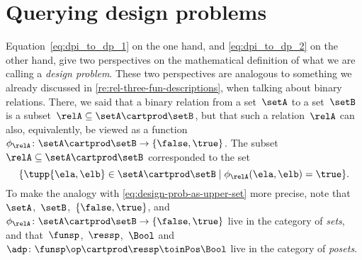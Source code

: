 
\section{Querying design problems}
\label{sec:dp-querying}



Equation~\cref{eq:dpi_to_dp_1} on the one hand, and \cref{eq:dpi_to_dp_2} on the other hand, give two perspectives on the mathematical definition of what we are calling a \emph{design problem}.
These two perspectives are analogous to something we already discussed in \cref{re:rel-three-fun-descriptions}, when talking about binary relations.
There, we said that a binary relation from a set~$\setA$ to a set~$\setB$ is a subset~$\relA \subseteq \setA \cartprod \setB$,
but that such a relation~$\relA$ can also, equivalently, be viewed as a function~$\phi_{\relA}\colon \setA \cartprod\setB \to \{ \false, \true \}$.
The subset~$\relA \subseteq \setA \cartprod \setB$ corresponded to the set
\begin{equation}
    \{ \tupp{\ela, \elb} \in \setA \cartprod \setB \mid \phi_{\relA}(\ela, \elb) = \true \}.
\end{equation}
%
To make the analogy with \cref{eq:design-prob-as-upper-set} more precise, note that~$\setA$,~$\setB$,~$\{ \false, \true \}$, and~$\phi_{\relA}\colon \setA \cartprod\setB \to \{ \false, \true \}$ live in the category of \emph{sets}, and that~$\funsp$,~$\ressp$,~$\Bool$ and~$\adp\colon \funsp\op \cartprod \ressp\toinPos \Bool$ live in the category of \emph{posets}.

